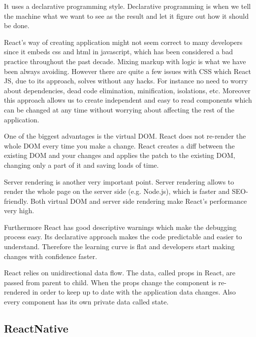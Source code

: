 \documentclass[thesis=M,english]{FITthesis}[2012/10/20]
\begin{document}
It uses a declarative programming style. Declarative programming is when we tell the machine what we want to see as the result and let it figure out how it should be done. \cite{react-fb}

React's way of creating application might not seem correct to many developers since it embeds css and html in javascript, which has been considered a bad practice throughout the past decade. Mixing markup with logic is what we have been always avoiding. However there are quite a few issues with CSS which React JS, due to its approach, solves without any hacks. For instance no need to worry about dependencies, dead code elimination, minification, isolations, etc. Moreover this approach allows us to create independent and easy to read components which can be changed at any time without worrying about affecting the rest of the application.

One of the biggest advantages is the virtual DOM. React does not re-render the whole DOM every time you make a change. React creates a diff between the existing DOM and your changes and applies the patch to the existing DOM, changing only a part of it and saving loads of time.

Server rendering is another very important point. Server rendering allows to render the whole page on the server side (e.g. Node.js), which is faster and SEO-friendly. Both virtual DOM and server side rendering make React's performance very high.

Furthermore React has good descriptive warnings which make the debugging process easy. Its declarative approach makes the code predictable and easier to understand. Therefore the learning curve is flat and developers start making changes with confidence faster. 

React relies on unidirectional data flow. The data, called props in React, are passed from parent to child. When the props change the component is re-rendered in order to keep up to date with the application data changes. Also every component has its own private data called state. \cite{react-ant}\cite{react-fb-native}\cite{react-telerik}

\subsection{ReactNative}
\end{document}
